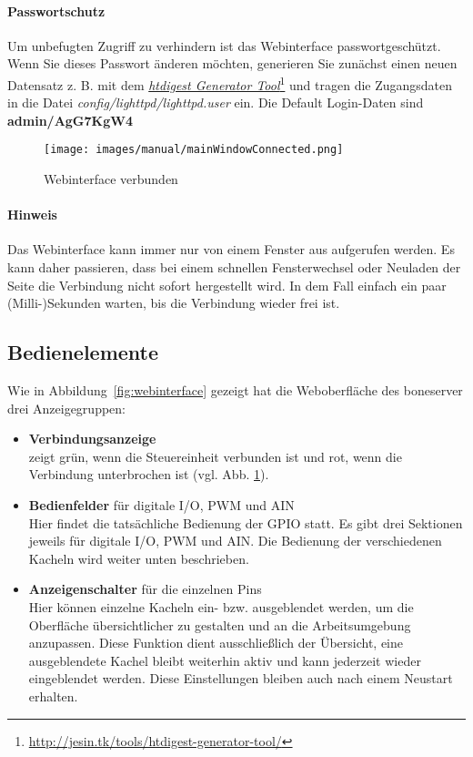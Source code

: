 \documentclass[manual.tex]{subfiles}
\begin{document}
\paragraph{Passwortschutz} Um unbefugten Zugriff zu verhindern ist das Webinterface passwortgeschützt. Wenn Sie dieses Passwort änderen möchten, generieren Sie zunächst einen neuen Datensatz z. B. mit dem \href{http://jesin.tk/tools/htdigest-generator-tool/}{\textit{htdigest Generator Tool}}\footnote{ \url{http://jesin.tk/tools/htdigest-generator-tool/}} und tragen die Zugangsdaten in die Datei \textit{config/lighttpd/lighttpd.user} ein. Die Default Login-Daten sind \textbf{admin/AgG7KgW4}

\begin{figure}[ht] 
	\centering
	\texttt{[image: images/manual/mainWindowConnected.png]}
	\caption{Webinterface verbunden}
	\label{fig:mainWindowConnected}
\end{figure}

\paragraph{Hinweis} Das Webinterface kann immer nur von einem Fenster aus aufgerufen werden. Es kann daher passieren, dass bei einem schnellen Fensterwechsel oder Neuladen der Seite die Verbindung nicht sofort hergestellt wird. In dem Fall einfach ein paar (Milli-)Sekunden warten, bis die Verbindung wieder frei ist.


\subsection{Bedienelemente}
Wie in \mbox{Abbildung \ref{fig:webinterface}} gezeigt hat die Weboberfläche des boneserver drei Anzeigegruppen:

\begin{itemize}
\item[\textbf{1}] \textbf{Verbindungsanzeige}\\
zeigt grün, wenn die Steuereinheit verbunden ist und rot, wenn die Verbindung unterbrochen ist (vgl. Abb. \ref{fig:mainWindowConnected}).
\item[\textbf{2}] \textbf{Bedienfelder} für digitale I/O, PWM und AIN\\
Hier findet die tatsächliche Bedienung der GPIO statt. Es gibt drei Sektionen jeweils für digitale I/O, PWM und AIN. Die Bedienung der verschiedenen Kacheln wird weiter unten beschrieben.
\item[\textbf{3}] \textbf{Anzeigenschalter} für die einzelnen Pins\\
Hier können einzelne Kacheln ein- bzw. ausgeblendet werden, um die Oberfläche übersichtlicher zu gestalten und an die Arbeitsumgebung anzupassen. Diese Funktion dient ausschließlich der Übersicht, eine ausgeblendete Kachel bleibt weiterhin aktiv und kann jederzeit wieder eingeblendet werden. Diese Einstellungen bleiben auch nach einem Neustart erhalten.
\end{itemize}
\end{document}
